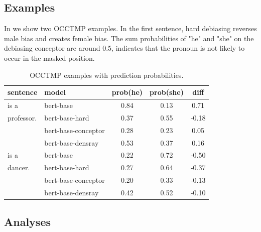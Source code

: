 \subsection{Examples}
In  we show two OCCTMP examples. In the first sentence, hard debiasing reverses male bias and creates female bias. The sum probabilities of "he" and "she" on the debiasing conceptor are around 0.5, indicates that the pronoun is not likely to occur in the masked position.
\begin{table}[h]
	\centering
	\footnotesize
	\begin{tabular}{llccc}
		\hline
		sentence & model & prob(he) & prob(she) &diff\\
		\hline
		[MASK] is a & bert-base & 0.84 & 0.13&0.71\\
		professor.& bert-base-hard& 0.37 & 0.55&-0.18\\
		& bert-base-conceptor& 0.28 & 0.23&0.05\\
		& bert-base-densray & 0.53 & 0.37&0.16\\
		\hline
		[MASK] is a & bert-base & 0.22 & 0.72&-0.50\\
		dancer.  & bert-base-hard& 0.27 & 0.64&-0.37\\
		& bert-base-conceptor& 0.20 & 0.33&-0.13\\
		& bert-base-densray& 0.42 & 0.52&-0.10\\
		\hline
	\end{tabular}
	\caption{
		OCCTMP examples with prediction probabilities.}
\end{table}


\subsection{Analyses}

